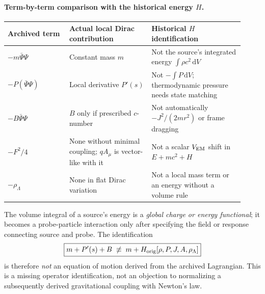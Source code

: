 \documentclass[11pt,a4paper]{article}
\newcommand{\dd}{\mathrm d}
\begin{document}
\paragraph{Term-by-term comparison with the historical energy $H$.}
\begin{center}\small
\begin{tabular}{@{}p{0.24\linewidth}p{0.32\linewidth}p{0.36\linewidth}@{}}\toprule
Archived term & Actual local Dirac contribution & Historical $H$ identification \\\midrule
$-m\bar\Psi\Psi$ & Constant mass $m$ & Not the source's integrated energy $\int\rho c^2\,\dd V$ \\
$-P(\bar\Psi\Psi)$ & Local derivative $P'(s)$ & Not $-\int P\,\dd V$; thermodynamic pressure needs state matching \\
$-B\bar\Psi\Psi$ & $B$ only if prescribed $c$-number & Not automatically $-J^2/(2mr^2)$ or frame dragging \\
$-F^2/4$ & None without minimal coupling; $qA_\mu$ is vector-like with it & Not a scalar $V_{\rm EM}$ shift in $E+mc^2+H$ \\
$-\rho_\Lambda$ & None in flat Dirac variation & Not a local mass term or an energy without a volume rule \\\bottomrule
\end{tabular}
\end{center}
The volume integral of a source's energy is a \emph{global charge or energy functional}; it becomes a probe-particle interaction only after specifying the field or response connecting source and probe. The identification
\begin{equation}\label{eq:qgd012-H-not-derived}
\boxed{m+P'(s)+B\;\not\equiv\;m+H_{\rm orig}[\rho,P,J,A,\rho_\Lambda]}
\end{equation}
is therefore \emph{not} an equation of motion derived from the archived Lagrangian. This is a missing operator identification, not an objection to normalizing a subsequently derived gravitational coupling with Newton's law.
\end{document}

